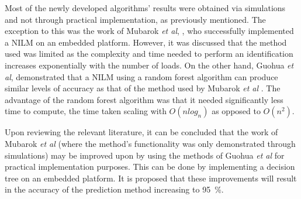 Most of the newly developed algorithms' results were obtained via simulations and not through practical implementation, as previously mentioned. The exception to this was the work of Mubarok \emph{et al}, \cite{RN47}, who successfully implemented a NILM on an embedded platform. However, it was discussed that the method used was limited as the complexity and time needed to perform an identification increases exponentially with the number of loads.  
On the other hand, Guohua \emph{et al}, \cite{RN39} demonstrated that a NILM using a random forest algorithm can produce similar levels of accuracy as that of the method used by Mubarok \emph{et al} \cite{RN47}. The advantage of the random forest algorithm was that it needed significantly less time to compute, the time taken scaling with $O(nlog_{n})$ as opposed to $O(n^{2})$.
\par
Upon reviewing the relevant literature, it can be concluded that the work of Mubarok \emph{et al} \cite{RN47} (where the method's functionality was only demonstrated through simulations) may be improved upon by using the methods of Guohua \emph{et al} \cite{RN39} for practical implementation purposes. This can be done by implementing a decision tree on an embedded platform. It is proposed that these improvements will result in the accuracy of the prediction method increasing to \qty{95}{\%}. 



